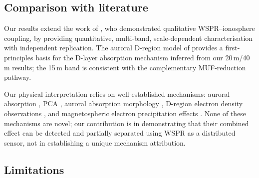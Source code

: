 \documentclass{agujournal2019}
\begin{document}
\subsection{Comparison with literature}

Our results extend the work of \citet{frissell2016}, who demonstrated
qualitative WSPR--ionosphere coupling, by providing quantitative,
multi-band, scale-dependent characterisation with independent replication.
The auroral D-region model of \citet{themens2021} provides a first-principles
basis for the D-layer absorption mechanism inferred from our 20\,m/40\,m
results; the 15\,m band is consistent with the complementary
MUF-reduction pathway.

Our physical interpretation relies on well-established mechanisms:
auroral absorption \citep{hargreaves1969}, PCA \citep{reid1974}, auroral
absorption morphology \citep{royrvik1977}, D-region electron density
observations \citep{kavanagh2004}, and magnetospheric electron precipitation
effects \citep{rodger2010}. None of these mechanisms are novel; our
contribution is in demonstrating that their combined effect can be
detected and partially separated using WSPR as a distributed sensor, not in
establishing a unique mechanism attribution.

\subsection{Limitations}
\end{document}
